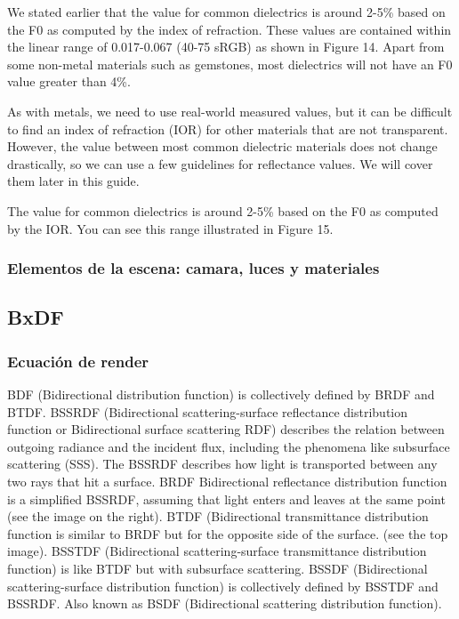             We stated earlier that the value for common dielectrics is around 2-5\% based on the F0 as computed by the index of refraction.
            These values are contained within the linear range of 0.017-0.067 (40-75 sRGB) as shown in Figure 14. Apart from some non-metal
            materials such as gemstones, most dielectrics will not have an F0 value greater than 4\%.
            
            As with metals, we need to use real-world measured values, but it can be difficult to find an index of refraction (IOR) for other
            materials that are not transparent. However, the value between most common dielectric materials does not change drastically, so
            we can use a few guidelines for reflectance values. We will cover them later in this guide.
            
            The value for common dielectrics is around 2-5\% based on the F0 as computed by the IOR. You can see this range illustrated in
            Figure 15.
        \subsubsection{Elementos de la escena: camara, luces y materiales}
        \newpage

    \subsection{BxDF}
        \subsubsection{Ecuaci\'on de render}
            BDF (Bidirectional distribution function) is collectively defined by BRDF and BTDF.
            BSSRDF (Bidirectional scattering-surface reflectance distribution function or Bidirectional surface scattering RDF)
            describes the relation between outgoing radiance and the incident flux, including the phenomena like subsurface scattering (SSS).
            The BSSRDF describes how light is transported between any two rays that hit a surface.
            BRDF Bidirectional reflectance distribution function is a simplified BSSRDF, assuming that light enters and leaves at the same
            point (see the image on the right).
            BTDF (Bidirectional transmittance distribution function is similar to BRDF but for the opposite side of the surface. (see the top
            image).
            BSSTDF (Bidirectional scattering-surface transmittance distribution function) is like BTDF but with subsurface scattering.
            BSSDF (Bidirectional scattering-surface distribution function) is collectively defined by BSSTDF and BSSRDF. Also known as BSDF
            (Bidirectional scattering distribution function).
        
